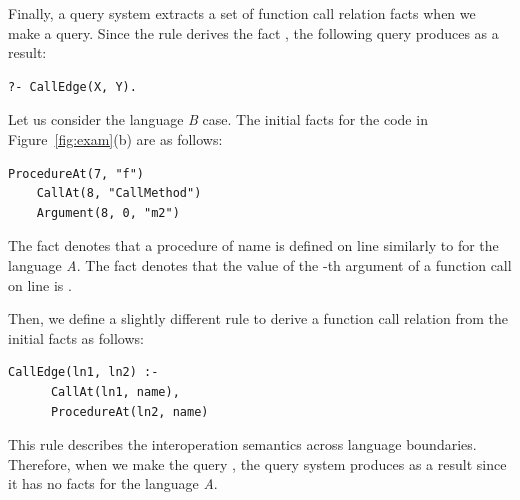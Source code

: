 Finally, a query system extracts a set of function call relation facts when we
make a query. Since the rule derives the fact , the
following query produces  as a result:


\begin{lstlisting}[style=mrule]
    ?- CallEdge(X, Y).
\end{lstlisting}


Let us consider the language {\it B} case.
The initial facts for the code in Figure~\ref{fig:exam}(b) are as follows: 

\begin{lstlisting}[style=mrule]
    ProcedureAt(7, "f")
    CallAt(8, "CallMethod")
    Argument(8, 0, "m2")
\end{lstlisting}

\noindent
The fact  denotes that a procedure of name
 is defined on line  similarly to
 for the language {\it A}.
The fact  denotes that the value of
the -th argument of a function call on line  is .

Then, we define a slightly different rule to derive a function call relation
from the initial facts as follows: 

\begin{lstlisting}[style=mrule]
    CallEdge(ln1, ln2) :-
      CallAt(ln1, name),
      ProcedureAt(ln2, name)
\end{lstlisting}

\noindent
This rule describes the interoperation semantics across language boundaries.
Therefore, when we make the query ,
the query system produces  as a result
since it has no facts for the language {\it A}.


